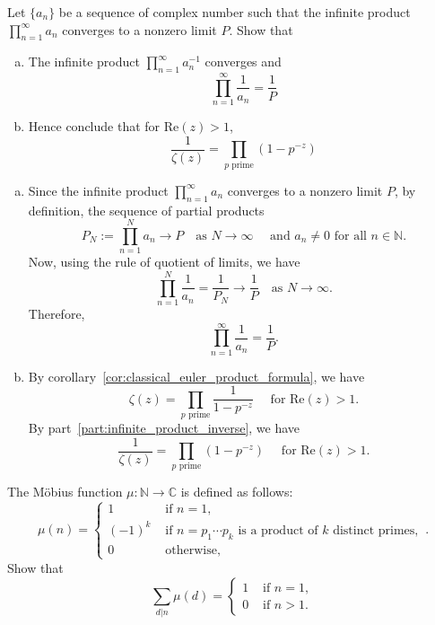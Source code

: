 \documentclass{elegantbook}
\begin{document}
\begin{problemset}[Exercises]
  \item \label{ex:infinite_product_inverse} Let $ \{ a_n \}$ be a sequence of complex number such that the infinite product $\prod_{n=1}^\infty a_n$ converges to a nonzero limit $P$. Show that 
  \begin{enumerate}[(a)]
    \item \label{part:infinite_product_inverse} The infinite product $\prod_{n=1}^{\infty}a^{-1}_n$ converges and
    \[
      \prod_{n=1}^{\infty} \frac{1}{a_n}=\frac{1}{P}
    \]
    \item Hence conclude that for $\mathrm{Re}(z)>1$,
    \[
      \frac{1}{\zeta(z)}=\prod_{p \text{ prime}}(1-p^{-z})
    \]
  \end{enumerate}
  \begin{solution}
    \begin{enumerate}[(a)]
      \item Since the infinite product $\prod_{n=1}^\infty a_n$ converges to a nonzero limit $P$, by definition, the sequence of partial products
      \[
        P_N := \prod_{n=1}^N a_n \longrightarrow P \quad \text{as } N \to \infty \quad \text{ and } a_n \neq 0 \text{ for all } n \in \mathbb{N}.
      \]
      Now, using the rule of quotient of limits, we have
      \[
        \prod_{n=1}^N \frac{1}{a_n} = \frac{1}{P_N} \longrightarrow \frac{1}{P} \quad \text{as } N \to \infty.
      \]
      Therefore,
      \[
        \prod_{n=1}^\infty \frac{1}{a_n} = \frac{1}{P}.
      \]
      \item By corollary~\ref{cor:classical_euler_product_formula}, we have
      \[
        \zeta(z) = \prod_{p \text{ prime}} \frac{1}{1 - p^{-z}} \quad \text{ for } \mathrm{Re}(z) > 1.
      \]
      By part~\ref{part:infinite_product_inverse}, we have
      \[
        \frac{1}{\zeta(z)} = \prod_{p \text{ prime}} (1 - p^{-z}) \quad \text{ for } \mathrm{Re}(z) > 1.
      \]
    \end{enumerate}
  \end{solution}
  \item \label{ex:mobius_function_sum} The Möbius function $\mu:\mathbb{N} \to \mathbb{C}$ is defined as follows:
  \[
    \mu(n) = \begin{cases}
      1 & \text{ if } n=1, \\
      (-1)^k & \text{ if } n=p_1\cdots p_k \text{ is a product of } k \text{ distinct primes}, \\
      0 & \text{ otherwise},
    \end{cases}.
  \]
  Show that
  \[
    \sum_{d|n} \mu(d) = \begin{cases}
      1 & \text{ if } n=1, \\
      0 & \text{ if } n>1.
    \end{cases}
  \]


\end{problemset}
\end{document}
